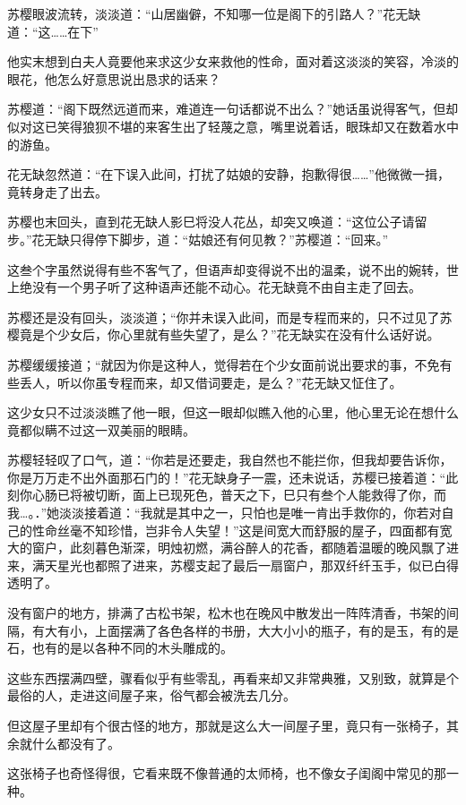 \documentclass[12pt,oneside]{book}
\begin{document}
苏樱眼波流转，淡淡道：``山居幽僻，不知哪一位是阁下的引路人？''花无缺道：``这\ldots\ldots 在下''

他实末想到白夫人竟要他来求这少女来救他的性命，面对着这淡淡的笑容，冷淡的眼花，他怎么好意思说出恳求的话来？

苏樱道：``阁下既然远道而来，难道连一句话都说不出么？''她话虽说得客气，但却似对这已笑得狼狈不堪的来客生出了轻蔑之意，嘴里说着话，眼珠却又在数着水中的游鱼。

花无缺忽然道：``在下误入此间，打扰了姑娘的安静，抱歉得很\ldots\ldots{}''他微微一揖，竟转身走了出去。

苏樱也末回头，直到花无缺人影巳将没人花丛，却突又唤道：``这位公子请留步。''花无缺只得停下脚步，道：``姑娘还有何见教？''苏樱道：``回来。''

这叁个字虽然说得有些不客气了，但语声却变得说不出的温柔，说不出的婉转，世上绝没有一个男子听了这种语声还能不动心。花无缺竟不由自主走了回去。

苏樱还是没有回头，淡淡道；``你并未误入此间，而是专程而来的，只不过见了苏樱竟是个少女后，你心里就有些失望了，是么？''花无缺实在没有什么话好说。

苏樱缓缓接道；``就因为你是这种人，觉得若在个少女面前说出要求的事，不免有些丢人，听以你虽专程而来，却又借词要走，是么？''花无缺又怔住了。

这少女只不过淡淡瞧了他一眼，但这一眼却似瞧入他的心里，他心里无论在想什么竟都似瞒不过这一双美丽的眼睛。

苏樱轻轻叹了口气，道：``你若是还要走，我自然也不能拦你，但我却要告诉你，你是万万走不出外面那石门的！''花无缺身子一震，还未说话，苏樱已接着道：``此刻你心肠已将被切断，面上已现死色，普天之下，巳只有叁个人能救得了你，而我\ldots。．''她淡淡接着道：``我就是其中之一，只怕也是唯一肯出手救你的，你若对自己的性命丝毫不知珍惜，岂非令人失望！''这是间宽大而舒服的屋子，四面都有宽大的窗户，此刻暮色渐深，明烛初燃，满谷醉人的花香，都随着温暖的晚风飘了进来，满天星光也都照了进来，苏樱支起了最后一扇窗户，那双纤纤玉手，似已白得透明了。

没有窗户的地方，排满了古松书架，松木也在晚风中散发出一阵阵清香，书架的间隔，有大有小，上面摆满了各色各样的书册，大大小小的瓶子，有的是玉，有的是石，也有的是以各种不同的木头雕成的。

这些东西摆满四壁，骤看似乎有些零乱，再看来却又非常典雅，又别致，就算是个最俗的人，走进这间屋子来，俗气都会被洗去几分。

但这屋子里却有个很古怪的地方，那就是这么大一间屋子里，竟只有一张椅子，其余就什么都没有了。

这张椅子也奇怪得很，它看来既不像普通的太师椅，也不像女子闺阁中常见的那一种。
\end{document}
